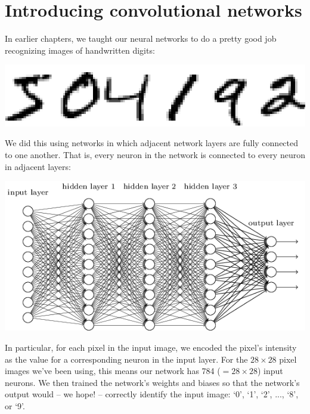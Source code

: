 \documentclass[a4paper,twoside,10pt]{book}
\begin{document}
\section{Introducing convolutional networks}
\label{subseq:cnn}
In earlier chapters, we taught our neural networks to do a pretty good job recognizing images of handwritten digits:
\begin{center}
	\includegraphics[width=0.4\linewidth]{figures/ch1/digits}
\end{center}
We did this using networks in which adjacent network layers are fully connected to one another. That is, every neuron in the network is connected to every neuron in adjacent layers:
\begin{center}
	\includegraphics[width=0.85\linewidth]{figures/ch6/tikz41}
\end{center}
In particular, for each pixel in the input image, we encoded the pixel's intensity as the value for a corresponding neuron in the input layer. For the $28\times28$ pixel images we've been using, this means our network has 784 ($=28\times28$) input neurons. We then trained the network's weights and biases so that the network's output would -- we hope! -- correctly identify the input image: `0', `1', `2', ..., `8', or `9'.
\end{document}
